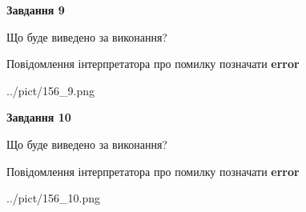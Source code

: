 \documentclass[12pt, ukrainian]{article}
\begin{document}
{{\begin {center}\textbf{Завдання 9}\end {center}}\par
Що буде виведено за виконання? \par
Повідомлення інтерпретатора про помилку позначати \textbf{error}

\begin{center}
	{../pict/156_9.png}
\end{center}
\newpage

{\begin {center}\textbf{Завдання 10}\end {center}}\par
Що буде виведено за виконання? \par
Повідомлення інтерпретатора про помилку позначати \textbf{error}

\begin{center}
	{../pict/156_10.png}
\end{center}
\newpage

}
\end{document}
